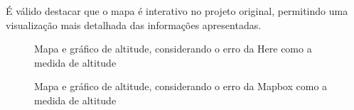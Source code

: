 \documentclass{article}
\begin{document}
É válido destacar que o mapa é interativo no projeto original, permitindo uma visualização mais detalhada das informações apresentadas.

\begin{figure}[h]
  \centering
  \caption{Mapa e gráfico de altitude, considerando o erro da Here como a medida de altitude}
  \label{fig:alt1}
\end{figure}

\begin{figure}[h]
  \centering
  \caption{Mapa e gráfico de altitude, considerando o erro da Mapbox como a medida de altitude}
  \label{fig:alt2}
\end{figure}
\end{document}
